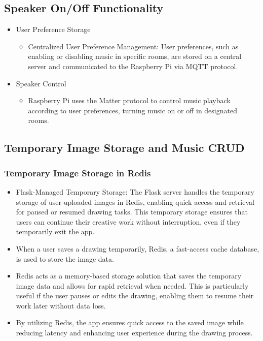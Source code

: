 \documentclass[conference]{IEEEtran}
\begin{document}
\subsection{Speaker On/Off Functionality}
\begin{itemize}
    \item User Preference Storage
\begin{itemize}
    \item Centralized User Preference Management: User preferences, such as enabling or disabling music in specific rooms, are stored on a central server and communicated to the Raspberry Pi via MQTT protocol.\\
\end{itemize}
\end{itemize}
\begin{itemize}
    \item Speaker Control
\begin{itemize}
    \item Raspberry Pi uses the Matter protocol to control music playback according to user preferences, turning music on or off in designated rooms.\\
\end{itemize}
\end{itemize}

\subsection{Temporary Image Storage and Music CRUD}

\subsubsection{Temporary Image Storage in Redis}
\begin{itemize}
    \item Flask-Managed Temporary Storage: The Flask server handles the temporary storage of user-uploaded images in Redis, enabling quick access and retrieval for paused or resumed drawing tasks. This temporary storage ensures that users can continue their creative work without interruption, even if they temporarily exit the app.\\
    \item When a user saves a drawing temporarily, Redis, a fast-access cache database, is used to store the image data.\\
    \item Redis acts as a memory-based storage solution that saves the temporary image data and allows for rapid retrieval when needed. This is particularly useful if the user pauses or edits the drawing, enabling them to resume their work later without data loss. \\
    \item By utilizing Redis, the app ensures quick access to the saved image while reducing latency and enhancing user experience during the drawing process.\\
\end{itemize}
\end{document}
